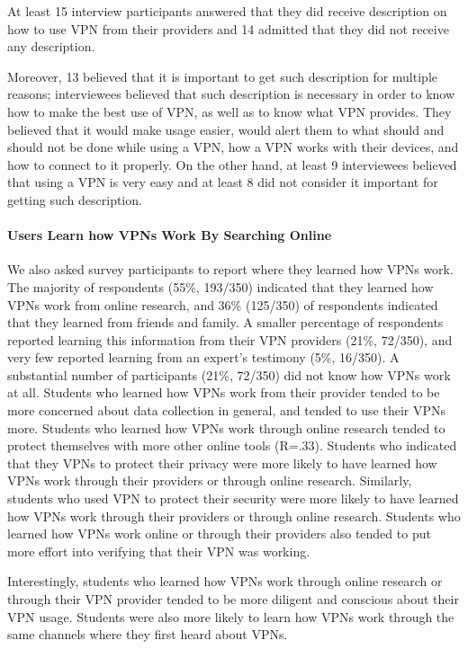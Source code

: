At least 15 interview participants answered that they did receive description
on how to use VPN from their providers and 14 admitted that they did not
receive any description.  

Moreover, 13 believed that it is important to get such description for
multiple reasons; interviewees believed that such description is necessary in
order to know how to make the best use of VPN, as well as to know what VPN
provides. They believed that it would make usage easier, would alert them to what should and should not be done while using a VPN, how a
VPN works with their devices, and how to connect to it properly. On the
other hand, at least 9 interviewees believed that using a VPN is very easy and
at least 8 did not consider it important for getting such description. 


\paragraph{Users Learn how VPNs Work By Searching Online}
We also asked survey participants to report where they learned how VPNs work.
The majority of respondents (55\%, 193/350) indicated that they learned how
VPNs work from online research, and 36\% (125/350) of respondents indicated
that they learned from friends and family. A smaller percentage of respondents
reported learning this information from their VPN providers (21\%, 72/350),
and very few reported learning from an expert’s testimony (5\%, 16/350). A
substantial number of participants (21\%, 72/350) did not know how VPNs work
at all.  Students who learned how VPNs work from their provider tended to be
more concerned about data collection in general, and tended to use their VPNs
more. Students who learned how VPNs work through online research tended to
protect themselves with more other online tools (R=.33). Students who
indicated that they VPNs to protect their privacy were more likely to have
learned how VPNs work through their providers or through online research.
Similarly, students who used VPN to protect their security were more likely to
have learned how VPNs work through their providers or through online research.
Students who learned how VPNs work online or through their providers also
tended to put more effort into verifying that their VPN was working.

Interestingly, students who learned how VPNs work through online research or
through their VPN provider tended to be more diligent and conscious about
their VPN usage. Students were also more likely to learn how VPNs work through
the same channels where they first heard about VPNs. 



